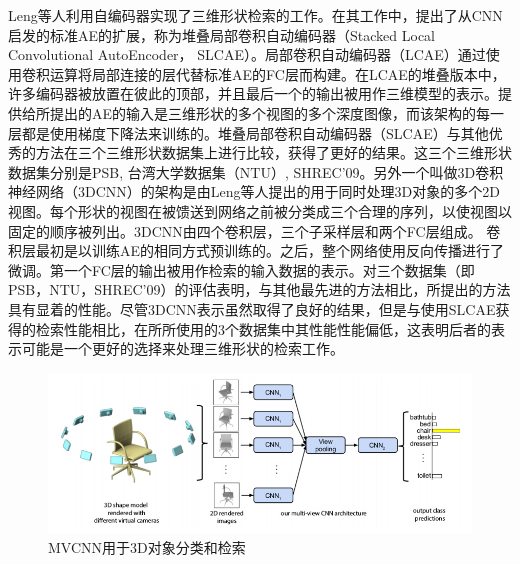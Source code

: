 Leng等人\cite{Leng20153D}利用自编码器实现了三维形状检索的工作。在其工作中，提出了从CNN启发的标准AE的扩展，称为堆叠局部卷积自动编码器（Stacked Local Convolutional AutoEncoder， SLCAE）。局部卷积自动编码器（LCAE）通过使用卷积运算将局部连接的层代替标准AE的FC层而构建。在LCAE的堆叠版本中，许多编码器被放置在彼此的顶部，并且最后一个的输出被用作三维模型的表示。提供给所提出的AE的输入是三维形状的多个视图的多个深度图像，而该架构的每一层都是使用梯度下降法来训练的。堆叠局部卷积自动编码器（SLCAE）与其他优秀的方法在三个三维形状数据集上进行比较，获得了更好的结果。这三个三维形状数据集分别是PSB\cite{Shilane2004The}, 台湾大学数据集（NTU）\cite{Chen2003On}, SHREC'09\cite{Godil2009SHREC}。另外一个叫做3D卷积神经网络（3DCNN）的架构是由Leng等人提出的\cite{Godil2009SHREC}用于同时处理3D对象的多个2D视图。每个形状的视图在被馈送到网络之前被分类成三个合理的序列，以使视图以固定的顺序被列出。3DCNN由四个卷积层，三个子采样层和两个FC层组成。 卷积层最初是以训练AE的相同方式预训练的。之后，整个网络使用反向传播进行了微调。第一个FC层的输出被用作检索的输入数据的表示。对三个数据集（即PSB，NTU，SHREC'09）的评估表明，与其他最先进的方法相比，所提出的方法具有显着的性能。尽管3DCNN表示虽然取得了良好的结果，但是与使用SLCAE\cite{Leng20153D}获得的检索性能相比，在所所使用的3个数据集中其性能性能偏低，这表明后者的表示可能是一个更好的选择来处理三维形状的检索工作。
\begin{figure}[tb]
\begin{center}
\includegraphics[width=0.98\linewidth]{figures/Su.jpg} 
\end{center} 
\vspace{-4mm}
\caption{MVCNN用于3D对象分类和检索} 
\label{fig_Su}
\end{figure}


